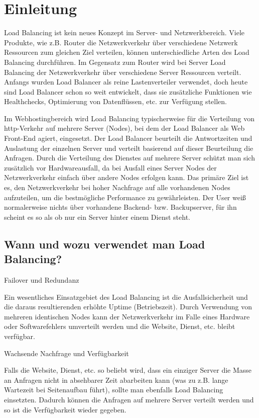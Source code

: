 
\section{Einleitung}
\label{sec:Einleitung}
Load Balancing ist kein neues Konzept im Server- und Netzwerkbereich. Viele Produkte, wie z.B. Router die Netzwerkverkehr über verschiedene Netzwerk Ressourcen zum gleichen Ziel verteilen, können unterschiedliche Arten des Load Balancing durchführen. Im Gegensatz zum Router wird bei Server Load Balancing der Netzwerkverkehr über verschiedene Server Ressourcen verteilt. Anfangs wurden Load Balancer als reine Lastenverteiler verwendet, doch heute sind Load Balancer schon so weit entwickelt, dass sie zusätzliche Funktionen wie Healthchecks, Optimierung von Datenflüssen, etc. zur Verfügung stellen.

Im Webhostingbereich wird Load Balancing typischerweise für die Verteilung von http-Verkehr auf mehrere Server (Nodes), bei dem der Load Balancer als Web Front-End agiert, eingesetzt. Der Load Balancer beurteilt die Antwortzeiten und Auslastung der einzelnen Server und verteilt basierend auf dieser Beurteilung die Anfragen. Durch die Verteilung des Dienstes auf mehrere Server schützt man sich zusätzlich vor Hardwareausfall, da bei Ausfall eines Server Nodes der Netzwerkverkehr einfach über andere Nodes erfolgen kann. Das primäre Ziel ist es, den Netzwerkverkehr bei hoher Nachfrage auf alle vorhandenen Nodes aufzuteilen, um die bestmögliche Performance zu gewährleisten. Der User weiß normalerweise nichts über vorhandene Backend- bzw. Backupserver, für ihn scheint es so als ob nur ein Server hinter einem Dienst steht. 
 \cite{LoadBalancing1}

\subsection{Wann und wozu verwendet man Load Balancing?}
\label{sec:Wann und wozu verwendet man Load Balancing?}

\begin{list}{•}{}
\item Failover und Redundanz

	  Ein wesentliches Einsatzgebiet des Load Balancing ist die Ausfallsicherheit und die daraus resultierenden 		  erhöhte Uptime (Betriebszeit). Durch Verwendung von mehreren identischen Nodes kann der Netzwerkverkehr im 	  Falle eines Hardware oder Softwarefehlers umverteilt werden und die Website, Dienst, etc. bleibt 			 	  verfügbar. 
\item Wachsende Nachfrage und Verfügbarkeit
	  
	  Falls die Website, Dienst, etc. so beliebt wird, dass ein einziger Server die Masse an Anfragen nicht in 			  absehbarer Zeit abarbeiten kann (was zu z.B. lange Wartezeit bei Seitenaufbau führt), sollte man ebenfalls 	  Load Balancing einsetzten. Dadurch können die Anfragen auf mehrere Server verteilt werden und so ist die 			  Verfügbarkeit wieder gegeben. \cite{LoadBalancing1}  
\end{list}

